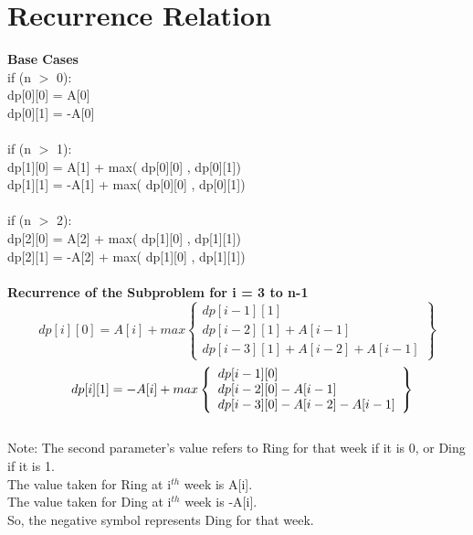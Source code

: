 \documentclass{article}
\begin{document}
\section{Recurrence Relation}
\textbf{Base Cases}\\
if (n $>$ 0):{\\
\-\hspace{20pt}dp[0][0] = A[0]\\
\-\hspace{20pt}dp[0][1] = -A[0]\\
}\\
if (n $>$ 1):{\\
\-\hspace{20pt}dp[1][0] = A[1] + max( dp[0][0] , dp[0][1])\\
\-\hspace{20pt}dp[1][1] = -A[1] + max( dp[0][0] , dp[0][1])\\
}\\
if (n $>$ 2):{\\
\-\hspace{20pt}dp[2][0] = A[2] + max( dp[1][0] , dp[1][1])\\
\-\hspace{20pt}dp[2][1] = -A[2] + max( dp[1][0] , dp[1][1])\\
}\\
\textbf{Recurrence of the Subproblem for i = 3 to n-1}\\\[dp[i][0] = A[i] + max\left\{\begin{array}{lr}
        dp[i-1][1]\\
      dp[i-2][1] + A[i-1]\\
      dp[i-3][1] + A[i-2] + A[i-1]
        \end{array}\right\}
  \] \[\-\hspace{8pt}dp[i][1] = -A[i] + max\left\{\begin{array}{lr}
        dp[i-1][0]\\
        dp[i-2][0] - A[i-1]\\
        dp[i-3][0] - A[i-2] - A[i-1]
        \end{array}\right\}
  \]
\\Note: The second parameter's value refers to Ring for that week if it is 0, or Ding if it is 1.\\
The value taken for Ring at i$^{th}$ week is A[i].\\
The value taken for Ding at i$^{th}$ week is -A[i].\\
So, the negative symbol represents Ding for that week.
\end{document}
